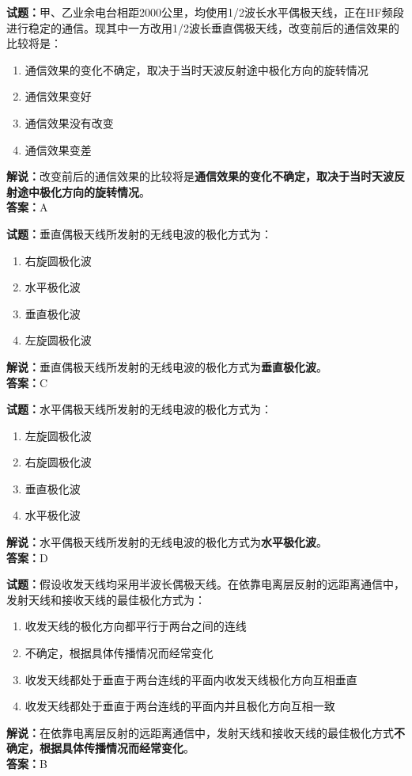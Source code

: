\documentclass{ctexbook}
\begin{document}
\noindent\textbf{试题：}甲、乙业余电台相距2000公里，均使用1/2波长水平偶极天线，正在HF频段进行稳定的通信。现其中一方改用1/2波长垂直偶极天线，改变前后的通信效果的比较将是：
\begin{enumerate}[leftmargin=3em]
\item 通信效果的变化不确定，取决于当时天波反射途中极化方向的旋转情况
\item 通信效果变好
\item 通信效果没有改变
\item 通信效果变差
\end{enumerate}
\noindent\textbf{解说：}改变前后的通信效果的比较将是\textbf{通信效果的变化不确定，取决于当时天波反射途中极化方向的旋转情况}。\\\noindent\textbf{答案：}A



\bigskip


\noindent\textbf{试题：}垂直偶极天线所发射的无线电波的极化方式为：
\begin{enumerate}[leftmargin=3em]
\item 右旋圆极化波
\item 水平极化波
\item 垂直极化波
\item 左旋圆极化波
\end{enumerate}
\noindent\textbf{解说：}垂直偶极天线所发射的无线电波的极化方式为\textbf{垂直极化波}。\\\noindent\textbf{答案：}C



\bigskip


\noindent\textbf{试题：}水平偶极天线所发射的无线电波的极化方式为：
\begin{enumerate}[leftmargin=3em]
\item 左旋圆极化波
\item 右旋圆极化波
\item 垂直极化波
\item 水平极化波
\end{enumerate}
\noindent\textbf{解说：}水平偶极天线所发射的无线电波的极化方式为\textbf{水平极化波}。\\\noindent\textbf{答案：}D



\bigskip


\noindent\textbf{试题：}假设收发天线均采用半波长偶极天线。在依靠电离层反射的远距离通信中，发射天线和接收天线的最佳极化方式为：
\begin{enumerate}[leftmargin=3em]
\item 收发天线的极化方向都平行于两台之间的连线
\item 不确定，根据具体传播情况而经常变化
\item 收发天线都处于垂直于两台连线的平面内收发天线极化方向互相垂直
\item 收发天线都处于垂直于两台连线的平面内并且极化方向互相一致
\end{enumerate}
\noindent\textbf{解说：}在依靠电离层反射的远距离通信中，发射天线和接收天线的最佳极化方式\textbf{不确定，根据具体传播情况而经常变化}。\\\noindent\textbf{答案：}B
\end{document}
